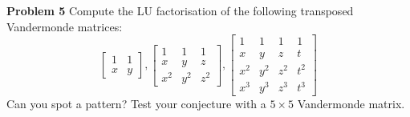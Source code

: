 \documentclass[12pt,a4paper]{article}
\begin{document}
\textbf{Problem 5} Compute the LU factorisation of the following transposed Vandermonde matrices:
\[
\begin{bmatrix}
1 & 1 \\
x & y
\end{bmatrix}, 
\begin{bmatrix}
1 & 1 & 1 \\
x & y & z \\
x^2 & y^2 & z^2
\end{bmatrix}, 
\begin{bmatrix}
1 & 1 & 1 & 1 \\
x & y & z & t \\
x^2 & y^2 & z^2 & t^2 \\
x^3 & y^3 & z^3 & t^3
\end{bmatrix}
\]
Can you spot a pattern? Test your conjecture with a $5 \ensuremath{\times} 5$ Vandermonde matrix. 
\end{document}
